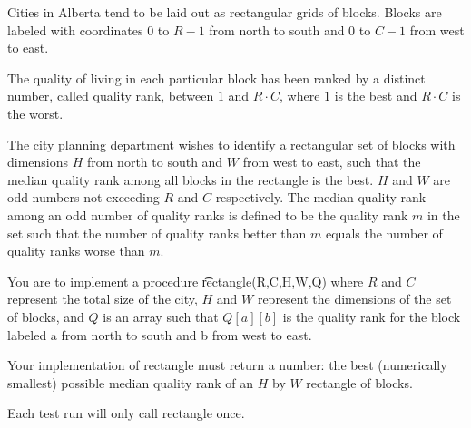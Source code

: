 Cities in Alberta tend to be laid out as rectangular grids of blocks. Blocks are labeled
with coordinates 0 to $R-1$ from north to south and 0 to $C-1$ from west to east.

The quality of living in each particular block has been ranked by a distinct number,
called quality rank, between $1$ and $R\cdot C$, where $1$ is the best and $R\cdot C$ is the worst.

The city planning department wishes to identify a rectangular set of blocks with
dimensions $H$ from north to south and $W$ from west to east, such that the median
quality rank among all blocks in the rectangle is the best. $H$ and $W$ are odd numbers
not exceeding $R$ and $C$ respectively. The median quality rank among an odd number
of quality ranks is defined to be the quality rank $m$ in the set such that the number of quality ranks better than $m$ equals the number of quality ranks worse than $m$.

You are to implement a procedure \t{rectangle(R,C,H,W,Q)} where $R$ and $C$ represent
the total size of the city, $H$ and $W$ represent the dimensions of the set of blocks,
and $Q$ is an array such that $Q[a][b]$ is the quality rank for the block labeled a from
north to south and b from west to east.

Your implementation of rectangle must return a number: the best (numerically
smallest) possible median quality rank of an $H$ by $W$ rectangle of blocks.

Each test run will only call rectangle once.